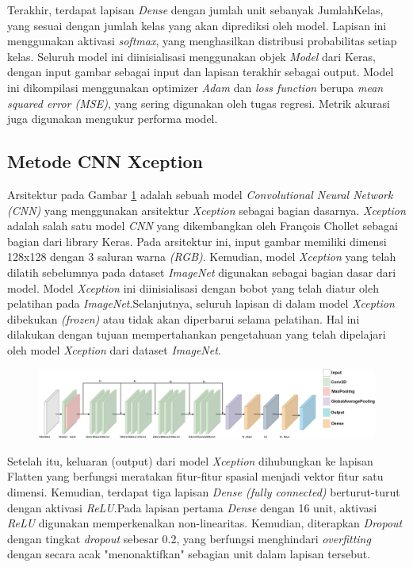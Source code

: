 Terakhir, terdapat lapisan \textit{Dense} dengan jumlah unit sebanyak JumlahKelas, yang sesuai dengan jumlah kelas yang akan diprediksi oleh model. Lapisan ini menggunakan aktivasi \textit{softmax}, yang menghasilkan distribusi probabilitas setiap kelas. Seluruh model ini diinisialisasi menggunakan objek \textit{Model} dari Keras, dengan input gambar sebagai input dan lapisan terakhir sebagai output. Model ini dikompilasi menggunakan optimizer \textit{Adam} dan \textit{loss function} berupa \textit{mean squared error (MSE)}, yang sering digunakan oleh tugas regresi. Metrik akurasi juga digunakan mengukur performa model.

\subsection{Metode CNN Xception}
Arsitektur pada Gambar \ref{fig:Xception} adalah sebuah model \textit{Convolutional Neural Network (\textit{CNN})} yang menggunakan arsitektur \textit{Xception} sebagai bagian dasarnya. \textit{Xception} adalah salah satu model \textit{CNN} yang dikembangkan oleh François Chollet sebagai bagian dari library Keras. Pada arsitektur ini, input gambar memiliki dimensi 128x128 dengan 3 saluran warna \textit{(RGB)}. Kemudian, model \textit{Xception} yang telah dilatih sebelumnya pada dataset \textit{ImageNet} digunakan sebagai bagian dasar dari model. Model \textit{Xception} ini diinisialisasi dengan bobot yang telah diatur oleh pelatihan pada \textit{ImageNet}.Selanjutnya, seluruh lapisan di dalam model \textit{Xception} dibekukan \textit{(frozen)} atau tidak akan diperbarui selama pelatihan. Hal ini dilakukan dengan tujuan mempertahankan pengetahuan yang telah dipelajari oleh model \textit{Xception} dari dataset \textit{ImageNet}.

\begin{figure}[hbt!]
	\centering
	\includegraphics[width=1.0\linewidth]{gambar/bener//Arsitektur_CNNXception_Modifikasi.png}
	\label{fig:Xception}
\end{figure}
Setelah itu, keluaran (output) dari model \textit{Xception} dihubungkan ke lapisan Flatten yang berfungsi meratakan fitur-fitur spasial menjadi vektor fitur satu dimensi. Kemudian, terdapat tiga lapisan \textit{Dense (fully connected)} berturut-turut dengan aktivasi \textit{ReLU}.Pada lapisan pertama \textit{Dense} dengan 16 unit, aktivasi \textit{ReLU} digunakan memperkenalkan non-linearitas. Kemudian, diterapkan \textit{Dropout} dengan tingkat \textit{dropout} sebesar 0.2, yang berfungsi menghindari \textit{overfitting} dengan secara acak "menonaktifkan" sebagian unit dalam lapisan tersebut.

